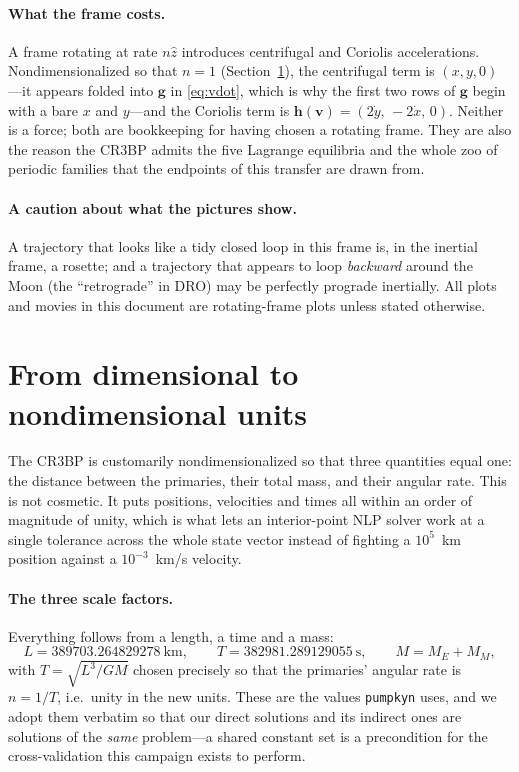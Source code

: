 \documentclass[11pt]{article}
\newcommand{\vecv}{\mathbf{v}}
\newcommand{\code}[1]{\texttt{#1}}
\begin{document}
\paragraph{What the frame costs.} A frame rotating at rate $n\hat z$ introduces
centrifugal and Coriolis accelerations. Nondimensionalized so that $n = 1$
(Section~\ref{sec:units}), the centrifugal term is $(x, y, 0)$---it appears
folded into $\mathbf{g}$ in \eqref{eq:vdot}, which is why the first two rows of
$\mathbf{g}$ begin with a bare $x$ and $y$---and the Coriolis term is
$\mathbf{h}(\vecv) = (2\dot y,\, -2\dot x,\, 0)$. Neither is a force; both are
bookkeeping for having chosen a rotating frame. They are also the reason the
CR3BP admits the five Lagrange equilibria and the whole zoo of periodic families
that the endpoints of this transfer are drawn from.

\paragraph{A caution about what the pictures show.} A trajectory that looks
like a tidy closed loop in this frame is, in the inertial frame, a rosette; and
a trajectory that appears to loop \emph{backward} around the Moon (the
``retrograde'' in DRO) may be perfectly prograde inertially. All plots and
movies in this document are rotating-frame plots unless stated otherwise.

\section{From dimensional to nondimensional units}
\label{sec:units}

The CR3BP is customarily nondimensionalized so that three quantities equal one:
the distance between the primaries, their total mass, and their angular rate.
This is not cosmetic. It puts positions, velocities and times all within an
order of magnitude of unity, which is what lets an interior-point NLP solver
work at a single tolerance across the whole state vector instead of fighting a
$10^{5}$~km position against a $10^{-3}$~km/s velocity.

\paragraph{The three scale factors.} Everything follows from a length, a time
and a mass:
\[
  L = 389703.264829278~\text{km}, \qquad
  T = 382981.289129055~\text{s}, \qquad
  M = M_E + M_M ,
\]
with $T = \sqrt{L^3 / GM}$ chosen precisely so that the primaries' angular rate
is $n = 1/T$, i.e.\ unity in the new units. These are the values \code{pumpkyn}
uses, and we adopt them verbatim so that our direct solutions and its indirect
ones are solutions of the \emph{same} problem---a shared constant set is a
precondition for the cross-validation this campaign exists to perform.
\end{document}
